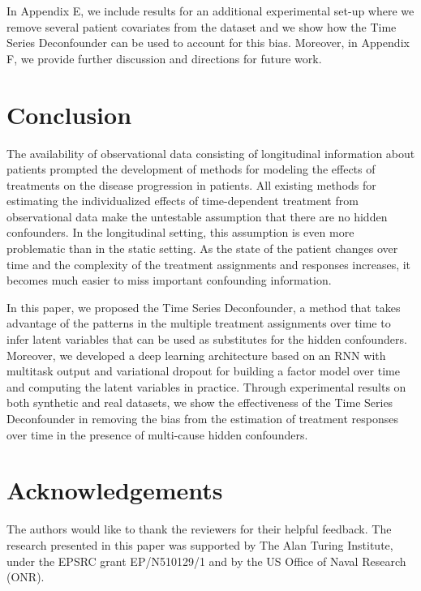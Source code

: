 \documentclass{article}
\begin{document}
    In Appendix E, we include results for an additional experimental set-up where we remove several patient covariates from the dataset and we show how the Time Series Deconfounder can be used to account for this bias. Moreover, in Appendix F, we provide further discussion and directions for future work. 

	\section{Conclusion}
	
	The availability of observational data consisting of longitudinal information about patients prompted the development of methods for modeling the effects of treatments on the disease progression in patients. All existing methods for estimating the individualized effects of time-dependent treatment from observational data make the untestable assumption that there are no hidden confounders. In the longitudinal setting, this assumption is even more problematic than in the static setting. As the state of the patient changes over time and the complexity of the treatment assignments and responses increases, it becomes much easier to miss important confounding information.  
    
    In this paper, we proposed the Time Series Deconfounder, a method that takes advantage of the patterns in the multiple treatment assignments over time to infer latent variables that can be used as substitutes for the hidden confounders. Moreover, we developed a deep learning architecture based on an RNN with multitask output and variational dropout for building a factor model over time and computing the latent variables in practice. Through experimental results on both synthetic and real datasets, we show the effectiveness of the Time Series Deconfounder in removing the bias from the estimation of treatment responses over time in the presence of multi-cause hidden confounders. 
	
    \section*{Acknowledgements}
    The authors would like to thank the reviewers for their helpful feedback. The research presented in this paper was supported by The Alan Turing Institute, under the EPSRC grant EP/N510129/1 and by the US Office of Naval Research (ONR).

	
	
	
	
	\appendix
    \onecolumn
    
\end{document}
